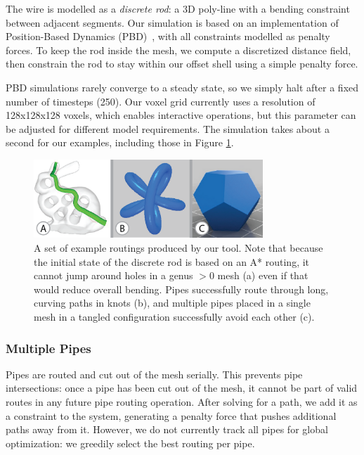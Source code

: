 The wire is modelled as a \emph{discrete rod}: a 3D poly-line with a bending 
constraint between adjacent segments. Our simulation is based on an
implementation of Position-Based Dynamics (PBD)~\cite{Muller07}, with all constraints
modelled as penalty forces. To keep the rod inside the
mesh, we compute a discretized distance field, then constrain the
rod to stay within our offset shell using a simple penalty force.


PBD simulations rarely converge to a steady state, so we simply halt after a fixed number of timesteps (250). Our voxel grid currently uses a resolution of 128x128x128 voxels, which enables interactive operations, but this parameter can be adjusted for different model requirements. The simulation takes about a second for our examples, including those in Figure \ref{fig:complex}.

\begin{figure}[h!]
\centering
    \includegraphics[width=3.4in]{figures/routing-tests.png}
\caption{A set of example routings produced by our tool.  Note that because the initial state of the discrete rod is based on an A* routing, it cannot jump around holes in a genus $>0$ mesh (a) even if that would reduce overall bending.  Pipes successfully route through long, curving paths in knots (b), and multiple pipes placed in a single mesh in a tangled configuration successfully avoid each other (c).}
\label{fig:complex}
\end{figure}

\subsubsection{Multiple Pipes}
Pipes are routed and cut out of the mesh serially. This prevents pipe intersections: once a pipe has been cut out of the mesh, it cannot be part of valid routes in any future pipe routing operation. After solving for a path, we add it as a constraint to the system, generating
a penalty force that pushes additional paths away from it.  However, we do not currently track all pipes for global optimization: we greedily select the best routing per pipe. 

